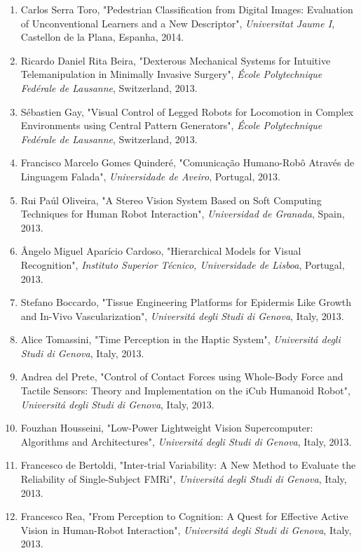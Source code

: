\begin{enumerate}
{  Coimbra}, Portugal, 2014.
\item
  Carlos Serra Toro, "Pedestrian Classification from Digital Images:
  Evaluation of Unconventional Learners and a New Descriptor",
  \emph{Universitat Jaume I}, Castellon de la Plana, Espanha, 2014.
\item
  Ricardo Daniel Rita Beira, "Dexterous Mechanical Systems for Intuitive
  Telemanipulation in Minimally Invasive Surgery", \emph{École
  Polytechnique Fedérale de Lausanne}, Switzerland, 2013.
\item
  Sébastien Gay, "Visual Control of Legged Robots for Locomotion in
  Complex Environments using Central Pattern Generators", \emph{École
  Polytechnique Fedérale de Lausanne}, Switzerland, 2013.
\item
  Francisco Marcelo Gomes Quinderé, "Comunicação Humano-Robô Através de
  Linguagem Falada", \emph{Universidade de Aveiro}, Portugal, 2013.
\item
  Rui Paúl Oliveira, "A Stereo Vision System Based on Soft Computing
  Techniques for Human Robot Interaction", \emph{Universidad de
  Granada}, Spain, 2013.
\item
  Ângelo Miguel Aparício Cardoso, "Hierarchical Models for Visual
  Recognition", \emph{Instituto Superior Técnico, Universidade de
  Lisboa}, Portugal, 2013.
\item
  Stefano Boccardo, "Tissue Engineering Platforms for Epidermis Like
  Growth and In-Vivo Vascularization", \emph{Universitá degli Studi di
  Genova}, Italy, 2013.
\item
  Alice Tomassini, "Time Perception in the Haptic System",
  \emph{Universitá degli Studi di Genova}, Italy, 2013.
\item
  Andrea del Prete, "Control of Contact Forces using Whole-Body Force
  and Tactile Sensors: Theory and Implementation on the iCub Humanoid
  Robot", \emph{Universitá degli Studi di Genova}, Italy, 2013.
\item
  Fouzhan Housseini, "Low-Power Lightweight Vision Supercomputer:
  Algorithms and Architectures", \emph{Universitá degli Studi di
  Genova}, Italy, 2013.
\item
  Francesco de Bertoldi, "Inter-trial Variability: A New Method to
  Evaluate the Reliability of Single-Subject FMRi", \emph{Universitá
  degli Studi di Genova}, Italy, 2013.
\item
  Francesco Rea, "From Perception to Cognition: A Quest for Effective
  Active Vision in Human-Robot Interaction", \emph{Universitá degli
  Studi di Genova}, Italy, 2013.

\end{enumerate}
